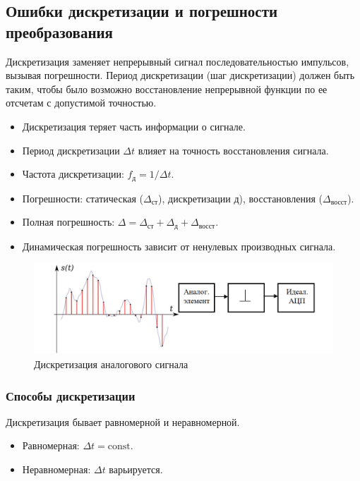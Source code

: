 	\subsection{Ошибки дискретизации и погрешности преобразования}
	Дискретизация заменяет непрерывный сигнал последовательностью импульсов, вызывая погрешности. Период дискретизации (шаг дискретизации) должен быть таким, чтобы 
	было возможно восстановление непрерывной функции по ее отсчетам с 
	допустимой точностью.
	\begin{itemize}
		\item Дискретизация теряет часть информации о сигнале.
		\item Период дискретизации $\Delta t$ влияет на точность восстановления сигнала.
		\item Частота дискретизации: $f_{\text{д}} = 1/\Delta t$.
		\item Погрешности: статическая ($\Delta_{\text{ст}}$), дискретизации $\text{д}$), восстановления ($\Delta_{\text{восст}}$).
		\item Полная погрешность: $\Delta = \Delta_{\text{ст}} + \Delta_{\text{д}} + \Delta_{\text{восст}}$.
		\item Динамическая погрешность зависит от ненулевых производных сигнала.
	\end{itemize}
	
	\begin{figure}[H]
		\centering
		\includegraphics[width=1\linewidth, height=0.2\textheight]{img/03_03}
		\small{Дискретизация аналогового сигнала}
		\label{fig:03_03}
	\end{figure}
	
	\subsubsection{Способы дискретизации}
	Дискретизация бывает равномерной и неравномерной.
	\begin{itemize}
		\item Равномерная: $\Delta t = \text{const}$.
		\item Неравномерная: $\Delta t$ варьируется.
	\end{itemize}
	
